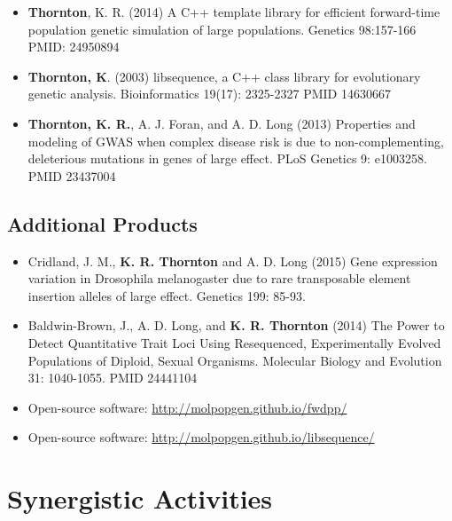 \begin{itemize} \setlength{\itemsep}{0pt} \setlength{\parskip}{2pt} \setlength{\parsep}{0pt}

\item \textbf{Thornton}, K. R. (2014) A C++ template library for efficient forward-time population genetic simulation of large populations. Genetics 98:157-166 PMID: 24950894

\item \textbf{Thornton, K}. (2003) libsequence, a C++ class library for evolutionary genetic analysis. Bioinformatics 19(17): 2325-2327 PMID 14630667

\item \textbf{Thornton, K. R.}, A. J. Foran, and A. D. Long (2013) Properties and modeling of GWAS when complex disease risk is due to non-complementing, deleterious mutations in genes of large effect. PLoS Genetics 9: e1003258. PMID 23437004

\end{itemize}

\subsection*{Additional Products}

\begin{itemize} \setlength{\itemsep}{0pt} \setlength{\parskip}{2pt} \setlength{\parsep}{0pt}

\item Cridland, J. M., \textbf{K. R. Thornton} and A. D. Long (2015) Gene expression variation in Drosophila melanogaster due to rare transposable element insertion alleles of large effect. Genetics 199: 85-93.

\item Baldwin-Brown, J., A. D. Long, and \textbf{K. R. Thornton} (2014) The Power to Detect Quantitative Trait Loci Using Resequenced, Experimentally Evolved Populations of Diploid, Sexual Organisms. Molecular Biology and Evolution 31: 1040-1055. PMID 24441104

\item Open-source software: \url{http://molpopgen.github.io/fwdpp/}

\item Open-source software: \url{http://molpopgen.github.io/libsequence/}
\end{itemize}

\section{Synergistic Activities}


